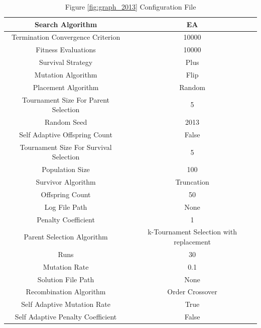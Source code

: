 \documentclass{standalone}
\begin{document}
\begin{table}[!htb]
	\centering
	\caption{Figure \ref{fig:graph_2013} Configuration File}
	\label{tab:graph_2013}
	\begin{tabular}{| c | c |}
		\hline
		Search Algorithm		& EA		 \\
		\hline
		Termination Convergence Criterion		& 10000		 \\
		\hline
		Fitness Evaluations		& 10000		 \\
		\hline
		Survival Strategy		& Plus		 \\
		\hline
		Mutation Algorithm		& Flip		 \\
		\hline
		Placement Algorithm		& Random		 \\
		\hline
		Tournament Size For Parent Selection		& 5		 \\
		\hline
		Random Seed		& 2013		 \\
		\hline
		Self Adaptive Offspring Count		& False		 \\
		\hline
		Tournament Size For Survival Selection		& 5		 \\
		\hline
		Population Size		& 100		 \\
		\hline
		Survivor Algorithm		& Truncation		 \\
		\hline
		Offspring Count		& 50		 \\
		\hline
		Log File Path		& None		 \\
		\hline
		Penalty Coefficient		& 1		 \\
		\hline
		Parent Selection Algorithm		& k-Tournament Selection with replacement		 \\
		\hline
		Runs		& 30		 \\
		\hline
		Mutation Rate		& 0.1		 \\
		\hline
		Solution File Path		& None		 \\
		\hline
		Recombination Algorithm		& Order Crossover		 \\
		\hline
		Self Adaptive Mutation Rate		& True		 \\
		\hline
		Self Adaptive Penalty Coefficient		& False		 \\
		\hline
	\end{tabular}
\end{table}
\end{document}
